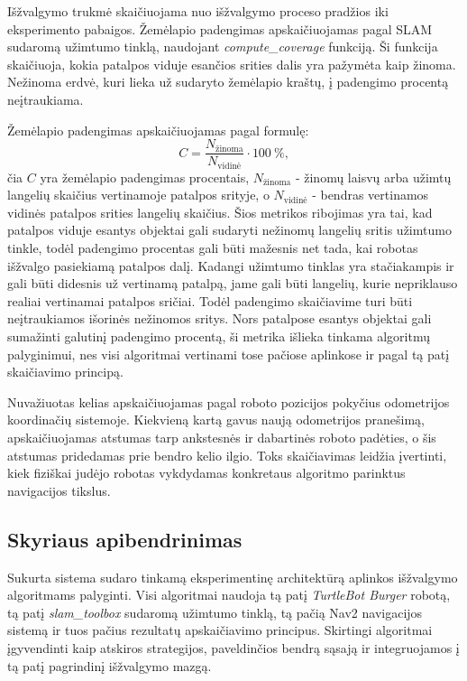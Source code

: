 \documentclass[]{VUMIFTemplateClass}
\begin{document}
Išžvalgymo trukmė skaičiuojama nuo išžvalgymo proceso pradžios iki eksperimento pabaigos. Žemėlapio padengimas apskaičiuojamas pagal SLAM sudaromą užimtumo
tinklą, naudojant \textit{compute\_coverage} funkciją. Ši funkcija skaičiuoja, kokia patalpos viduje esančios srities dalis yra pažymėta kaip žinoma.
Nežinoma erdvė, kuri lieka už sudaryto žemėlapio kraštų, į padengimo procentą neįtraukiama.

Žemėlapio padengimas apskaičiuojamas pagal formulę:
\begin{equation}
C = \frac{N_{\text{žinoma}}}{N_{\text{vidinė}}} \cdot 100~\%,
\end{equation}
čia $C$ yra žemėlapio padengimas procentais, $N_{\text{žinoma}}$ - žinomų laisvų arba užimtų langelių skaičius vertinamoje patalpos srityje, o
$N_{\text{vidinė}}$ - bendras vertinamos vidinės patalpos srities langelių skaičius.
Šios metrikos ribojimas yra tai, kad patalpos viduje esantys objektai gali sudaryti nežinomų langelių sritis užimtumo tinkle, todėl padengimo procentas gali
būti mažesnis net tada, kai robotas išžvalgo pasiekiamą patalpos dalį.
Kadangi užimtumo tinklas yra stačiakampis ir gali būti didesnis už vertinamą patalpą, jame gali būti langelių, kurie nepriklauso realiai vertinamai patalpos
sričiai. Todėl padengimo skaičiavime turi būti neįtraukiamos išorinės nežinomos sritys. Nors patalpose esantys objektai gali sumažinti galutinį padengimo procentą, ši
metrika išlieka tinkama algoritmų palyginimui, nes visi algoritmai vertinami tose pačiose aplinkose ir pagal tą patį skaičiavimo principą.

Nuvažiuotas kelias apskaičiuojamas pagal roboto pozicijos pokyčius odometrijos koordinačių sistemoje. Kiekvieną kartą gavus naują odometrijos pranešimą,
apskaičiuojamas atstumas tarp ankstesnės ir dabartinės roboto padėties, o šis atstumas pridedamas prie bendro kelio ilgio. Toks skaičiavimas leidžia įvertinti,
kiek fiziškai judėjo robotas vykdydamas konkretaus algoritmo parinktus navigacijos tikslus.

\subsection{Skyriaus apibendrinimas}

Sukurta sistema sudaro tinkamą eksperimentinę architektūrą aplinkos išžvalgymo algoritmams palyginti. Visi algoritmai naudoja tą patį \textit{TurtleBot
Burger} robotą, tą patį \textit{slam\_toolbox} sudaromą užimtumo tinklą, tą pačią Nav2 navigacijos sistemą ir tuos pačius rezultatų apskaičiavimo principus.
Skirtingi algoritmai įgyvendinti kaip atskiros strategijos, paveldinčios bendrą sąsają ir integruojamos į tą patį pagrindinį išžvalgymo mazgą.
\end{document}
